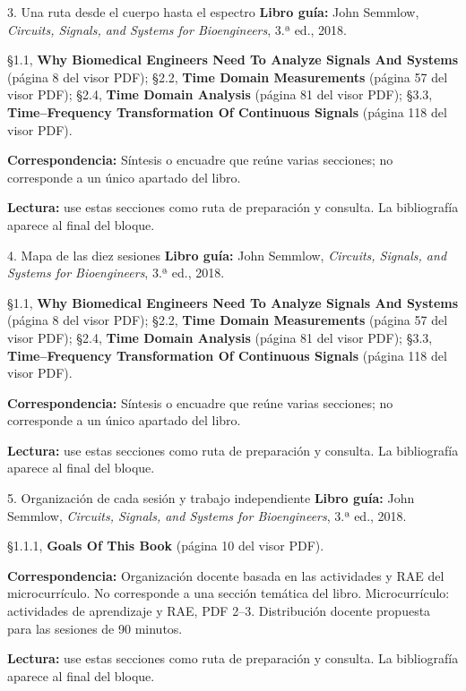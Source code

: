 \documentclass[
  10pt,
  ignorenonframetext,
  aspectratio=169,
  spanish,
]{beamer}
\begin{document}
\begin{frame}{3. Una ruta desde el cuerpo hasta el espectro}
\label{una-ruta-desde-el-cuerpo-hasta-el-espectro}
\textbf{Libro guía:} John Semmlow, \emph{Circuits, Signals, and Systems
for Bioengineers}, 3.ª ed., 2018.

§1.1, \textbf{Why Biomedical Engineers Need To Analyze Signals And
Systems} (página 8 del visor PDF); §2.2, \textbf{Time Domain
Measurements} (página 57 del visor PDF); §2.4, \textbf{Time Domain
Analysis} (página 81 del visor PDF); §3.3, \textbf{Time--Frequency
Transformation Of Continuous Signals} (página 118 del visor PDF).

\textbf{Correspondencia:} Síntesis o encuadre que reúne varias
secciones; no corresponde a un único apartado del libro.

\textbf{Lectura:} use estas secciones como ruta de preparación y
consulta. La bibliografía aparece al final del bloque.
\end{frame}

\begin{frame}{4. Mapa de las diez sesiones}
\label{mapa-de-las-diez-sesiones}
\textbf{Libro guía:} John Semmlow, \emph{Circuits, Signals, and Systems
for Bioengineers}, 3.ª ed., 2018.

§1.1, \textbf{Why Biomedical Engineers Need To Analyze Signals And
Systems} (página 8 del visor PDF); §2.2, \textbf{Time Domain
Measurements} (página 57 del visor PDF); §2.4, \textbf{Time Domain
Analysis} (página 81 del visor PDF); §3.3, \textbf{Time--Frequency
Transformation Of Continuous Signals} (página 118 del visor PDF).

\textbf{Correspondencia:} Síntesis o encuadre que reúne varias
secciones; no corresponde a un único apartado del libro.

\textbf{Lectura:} use estas secciones como ruta de preparación y
consulta. La bibliografía aparece al final del bloque.
\end{frame}

\begin{frame}{5. Organización de cada sesión y trabajo independiente}
\label{organizaciuxf3n-de-cada-sesiuxf3n-y-trabajo-independiente}
\textbf{Libro guía:} John Semmlow, \emph{Circuits, Signals, and Systems
for Bioengineers}, 3.ª ed., 2018.

§1.1.1, \textbf{Goals Of This Book} (página 10 del visor PDF).

\textbf{Correspondencia:} Organización docente basada en las actividades
y RAE del microcurrículo. No corresponde a una sección temática del
libro. Microcurrículo: actividades de aprendizaje y RAE, PDF 2--3.
Distribución docente propuesta para las sesiones de 90 minutos.

\textbf{Lectura:} use estas secciones como ruta de preparación y
consulta. La bibliografía aparece al final del bloque.
\end{frame}
\end{document}
